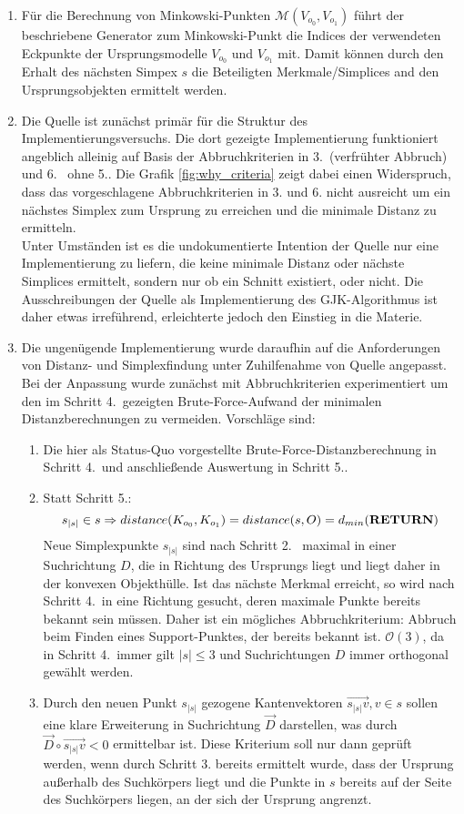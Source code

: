 \begin{enumerate}
\item Für die Berechnung von Minkowski-Punkten $\mathcal{M}(V_{o_0}, V_{o_1})$ führt der beschriebene Generator zum Minkowski-Punkt die Indices der verwendeten Eckpunkte der Ursprungsmodelle $V_{o_0}$ und $V_{o_1}$ mit. Damit können durch den Erhalt des nächsten Simpex $s$ die Beteiligten Merkmale/Simplices and den Ursprungsobjekten ermittelt werden.
\item Die Quelle \cite{gjk-casey} ist zunächst primär für die Struktur des Implementierungsversuchs. Die dort gezeigte Implementierung funktioniert angeblich alleinig auf Basis der Abbruchkriterien in 3.~(verfrühter Abbruch) und 6.~ ohne 5..
Die Grafik \ref{fig:why_criteria} zeigt dabei einen Widerspruch, dass das vorgeschlagene Abbruchkriterien in 3. und 6. nicht ausreicht um ein nächstes Simplex zum Ursprung zu erreichen und die minimale Distanz zu ermitteln.\\
Unter Umständen ist es die undokumentierte Intention der Quelle \cite{gjk-casey} nur eine Implementierung zu liefern, die keine minimale Distanz oder nächste Simplices ermittelt, sondern nur ob ein Schnitt existiert, oder nicht. Die Ausschreibungen der Quelle als Implementierung des GJK-Algorithmus ist daher etwas irreführend, erleichterte jedoch den Einstieg in die Materie.
\item Die ungenügende Implementierung wurde daraufhin auf die Anforderungen von Distanz- und Simplexfindung unter Zuhilfenahme von Quelle \cite{gjk} angepasst.
Bei der Anpassung wurde zunächst mit Abbruchkriterien experimentiert um den im Schritt 4.~gezeigten Brute-Force-Aufwand der minimalen Distanzberechnungen zu vermeiden. Vorschläge sind:
\begin{enumerate}
	\item Die hier als Status-Quo vorgestellte Brute-Force-Distanzberechnung in Schritt 4.~und anschließende Auswertung in Schritt 5..
	\item Statt Schritt 5.:
	 $$s_{|s|} \in s \Rightarrow distance(K_{o_0}, K_{o_1}) = distance(s, O) = d_{min}\text{(\textbf{RETURN})}$$ 
	 Neue Simplexpunkte $s_{|s|}$ sind nach Schritt 2.~ maximal in einer Suchrichtung $D$, die in Richtung des Ursprungs liegt und liegt daher in der konvexen Objekthülle. Ist das nächste Merkmal erreicht, so wird nach Schritt 4.~in eine Richtung gesucht, deren maximale Punkte bereits bekannt sein müssen. Daher ist ein mögliches Abbruchkriterium: Abbruch beim Finden eines Support-Punktes, der bereits bekannt ist. $\mathcal{O}(3)$, da in Schritt 4.~immer gilt $|s|\leq 3$ und Suchrichtungen $D$ immer orthogonal gewählt werden.
	\item Durch den neuen Punkt $s_{|s|}$ gezogene Kantenvektoren $\vec{s_{|s|}v}, v\in s$ sollen eine klare Erweiterung in Suchrichtung $\vec{D}$ darstellen, was durch $\vec{D} \circ \vec{s_{|s|}v} < 0$ ermittelbar ist. Diese Kriterium soll nur dann geprüft werden, wenn durch Schritt 3. bereits ermittelt wurde, dass der Ursprung außerhalb des Suchkörpers liegt und die Punkte in $s$ bereits auf der Seite des Suchkörpers liegen, an der sich der Ursprung angrenzt.
\end{enumerate}


\end{enumerate}

